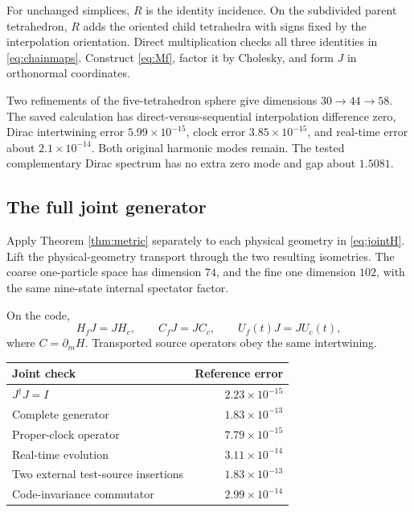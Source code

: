 For unchanged simplices, $R$ is the identity incidence. On the subdivided parent tetrahedron, $R$ adds the oriented child tetrahedra with signs fixed by the interpolation orientation. Direct multiplication checks all three identities in \eqref{eq:chainmaps}. Construct \eqref{eq:Mf}, factor it by Cholesky, and form $J$ in orthonormal coordinates.

Two refinements of the five-tetrahedron sphere give dimensions $30\to44\to58$. The saved calculation has direct-versus-sequential interpolation difference zero, Dirac intertwining error $5.99\times10^{-15}$, clock error $3.85\times10^{-15}$, and real-time error about $2.1\times10^{-14}$. Both original harmonic modes remain. The tested complementary Dirac spectrum has no extra zero mode and gap about $1.5081$.

\subsection{The full joint generator}

Apply Theorem \ref{thm:metric} separately to each physical geometry in \eqref{eq:jointH}. Lift the physical-geometry transport through the two resulting isometries. The coarse one-particle space has dimension $74$, and the fine one dimension $102$, with the same nine-state internal spectator factor.

On the code,
\begin{equation}
H_fJ=JH_c,\qquad C_fJ=JC_c,\qquad
U_f(t)J=JU_c(t),
\end{equation}
where $C=\partial_mH$. Transported source operators obey the same intertwining.

\begin{center}
\begin{tabular}{lr}
\toprule Joint check & Reference error\\\midrule
$J^\dagger J=I$ & $2.23\times10^{-15}$\\
Complete generator & $1.83\times10^{-13}$\\
Proper-clock operator & $7.79\times10^{-15}$\\
Real-time evolution & $3.11\times10^{-14}$\\
Two external test-source insertions & $1.83\times10^{-13}$\\
Code-invariance commutator & $2.99\times10^{-14}$\\
\bottomrule
\end{tabular}
\end{center}

